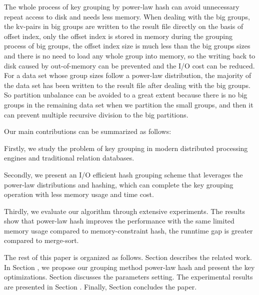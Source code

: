 The whole process of key grouping by power-law hash can avoid unnecessary repeat access to disk and needs less memory. When dealing with the big groups, the kv-pairs in big groups are written to the result file directly on the basis of offset index, only the offset index is stored in memory during the grouping process of big groups, the offset index size is much less than the big groups sizes and there is no need to load any whole group into memory, so the writing back to disk caused by out-of-memory can be prevented and the I/O cost can be reduced. For a data set whose group sizes follow a power-law distribution, the majority of the data set has been written to the result file after dealing with the big groups. So partition unbalance can be avoided to a great extent because there is no big groups in the remaining data set when we partition the small groups, and then it can prevent multiple recursive division to the big partitions.

Our main contributions can be summarized as follows:

\begin{list}{}{\setlength{\leftmargin}{5mm}\setlength{\itemindent}{0mm}
\setlength{\topsep}{0.5mm}\setlength{\itemsep}{2mm}\setlength{\parsep}{0mm}}
\item Firstly, we study the problem of key grouping in modern distributed processing engines and traditional relation databases.
\item Secondly, we present an I/O efficient hash grouping scheme that leverages the power-law distributions and hashing, which can complete the key grouping operation with less memory usage and time cost.
\item Thirdly, we evaluate our algorithm through extensive experiments. The results show that power-law hash improves the performance with the same limited memory usage compared to memory-constraint hash, the runntime gap is greater compared to merge-sort.
\end{list}


The rest of this paper is organized as follows. Section \uppercase\expandafter{} describes the related work. In Section \uppercase\expandafter{}, we propose our grouping method power-law hash and present the key optimizations. Section \uppercase\expandafter{} discusses the parameters setting. The experimental results are presented in Section \uppercase\expandafter{}. Finally, Section \uppercase\expandafter{} concludes the paper.

